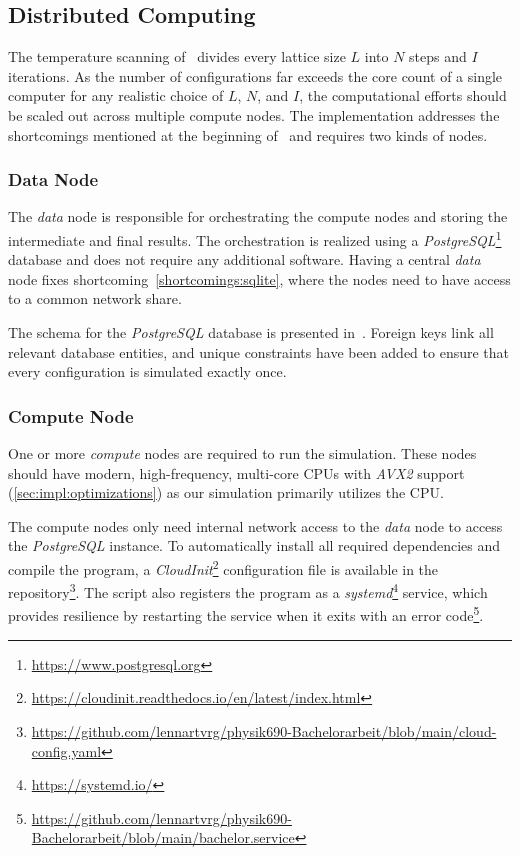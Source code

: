 \subsection{Distributed Computing}\label{sec:impl:computing}
	The temperature scanning of~ divides every lattice size $L$ into $N$ steps and $I$ iterations. As the number of configurations far exceeds the core count of a single computer for any realistic choice of $L$, $N$, and $I$, the computational efforts should be scaled out across multiple compute nodes. The implementation addresses the shortcomings mentioned at the beginning of~ and requires two kinds of nodes.
	
	\subsubsection{Data Node}\label{sec:impl:computing:data}
		The \emph{data} node is responsible for orchestrating the compute nodes and storing the intermediate and final results. The orchestration is realized using a  \emph{PostgreSQL}\footnote{\url{https://www.postgresql.org}} database and does not require any additional software. Having a central \emph{data} node fixes shortcoming~\cref{shortcomings:sqlite}, where the nodes need to have access to a common network share.
		
		The schema for the \emph{PostgreSQL} database is presented in~. Foreign keys link all relevant database entities, and unique constraints have been added to ensure that every configuration is simulated exactly once.
	
	\subsubsection{Compute Node}\label{sec:impl:computing:compute}
		One or more \emph{compute} nodes are required to run the simulation. These nodes should have modern, high-frequency, multi-core CPUs with \emph{AVX2} support (\cref{sec:impl:optimizations}) as our simulation primarily utilizes the CPU.
		
		The compute nodes only need internal network access to the \emph{data} node to access the \emph{PostgreSQL} instance. To automatically install all required dependencies and compile the program, a \emph{CloudInit}\footnote{\url{https://cloudinit.readthedocs.io/en/latest/index.html}} configuration file is available in the repository\footnote{\url{https://github.com/lennartvrg/physik690-Bachelorarbeit/blob/main/cloud-config.yaml}}. The script also registers the program as a \emph{systemd}\footnote{\url{https://systemd.io/}} service, which provides resilience by restarting the service when it exits with an error code\footnote{\url{https://github.com/lennartvrg/physik690-Bachelorarbeit/blob/main/bachelor.service}}.
